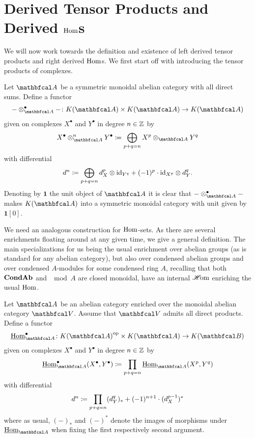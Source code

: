 \section[Derived Tensor Products and Derived Homs]{Derived Tensor Products and Derived ${\operatorname{Hom}}$s}

We will now work towards the definition and existence of left derived tensor products and right derived ${\operatorname{Hom}}$s. We first start off with introducing the tensor products of complexes.
\begin{definition}
	\label{definition: tensor products of complexes}
	
	Let $\category{A}$ be a symmetric monoidal abelian category with all direct sums. Define a functor
	$$-\otimes_\category{A}^\bullet - \colon \homotopyCategoryOfComplexes{\category{A}} \times \homotopyCategoryOfComplexes{
		\category{A}}\to \homotopyCategoryOfComplexes{\category{A}}$$
	given on complexes $X^\bullet$ and $Y^\bullet$ in degree $n\in {\mathbb{Z}}$ by
	$$X^\bullet\otimes_\category{A}^n Y^\bullet \ldef \bigoplus_{p+q=n} X^p \otimes_\category{A} Y^q$$
	with differential
	$$d^n \coloneqq \bigoplus_{p+q=n} d_X^p\otimes \mathrm{id}_{Y^q} + (-1)^p \cdot \mathrm{id}_{X^p}\otimes d_Y^q.$$
	Denoting by $\mathbf{1}$ the unit object of $\category{A}$ it is clear that $-\otimes_\category{A}^\bullet -$ makes $\homotopyCategoryOfComplexes{\category{A}}$ into a symmetric monoidal category with unit given by $\mathbf{1}[0]$.
\end{definition}

We need an analogous construction for ${\operatorname{Hom}}$-sets. As there are several enrichments floating around at any given time, we give a general definition. The main specializations for us being the usual enrichment over abelian groups (as is standard for any abelian category), but also over condensed abelian groups and over condensed $A$-modules for some condensed ring $A$, recalling that both ${{{\mathbf{Cond}}}{{\mathbf{Ab}}}}$ and $\mod{A}$ are closed monoidal, \ie have an internal ${\operatorname{\mathscr{H}\!om}}$ enriching the usual ${\operatorname{Hom}}$.
\begin{definition}
	\label{definition: complexes of Homs}
	
	Let $\category{A}$ be an abelian category enriched over the monoidal abelian category $\category{V}$. Assume that $\category{V}$ admits all direct products. Define a functor
		$$\eHom_\category{A}^\bullet\colon \homotopyCategoryOfComplexes{\category{A}}^\op \times \homotopyCategoryOfComplexes{\category{A}}\to \homotopyCategoryOfComplexes{\category{B}}$$
	given on complexes $X^\bullet$ and $Y^\bullet$ in degree $n\in {\mathbb{Z}}$ by
		$$\eHom_\category{A}^\bullet(X^\bullet, Y^\bullet)\ldef \prod_{p+q=n} \eHom_\category{A}(X^p, Y^q)$$
	with differential
		$$d^n \coloneqq \prod_{p+q=n} (d_Y^q)_\ast + (-1)^{n+1} \cdot (d_X^{p-1})^\ast$$
	where as usual, $(-)_\ast$ and $(-)^\ast$ denote the images of morphisms under $\eHom_\category{A}$ when fixing the first respectively second argument.
\end{definition}

